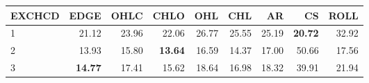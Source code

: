 \begin{table}[ht]
\centering
\begin{tabular}{lrrrrrrrr}
  \hline
EXCHCD & EDGE & OHLC & CHLO & OHL & CHL & AR & CS & ROLL \\ 
  \hline
1 & 21.12 & 23.96 & 22.06 & 26.77 & 25.55 & 25.19 & \textbf{20.72} & 32.92 \\ 
  2 & 13.93 & 15.80 & \textbf{13.64} & 16.59 & 14.37 & 17.00 & 50.66 & 17.56 \\ 
  3 & \textbf{14.77} & 17.41 & 15.62 & 18.64 & 16.98 & 18.32 & 39.91 & 21.94 \\ 
   \hline
\end{tabular}
\end{table}
